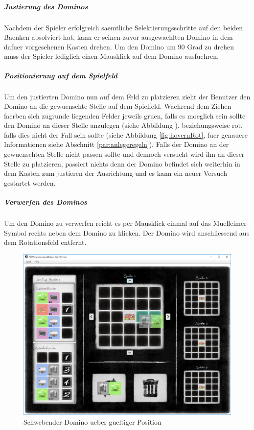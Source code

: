 \subparagraph{Justierung des Dominos}
Nachdem der Spieler erfolgreich saemtliche Selektierungsschritte auf den beiden Baenken absolviert hat, kann er seinen zuvor ausgewaehlten Domino in dem dafuer vorgesehenen Kasten drehen. Um den Domino um 90 Grad zu drehen muss der Spieler lediglich einen Mausklick auf dem Domino ausfuehren. 

\subparagraph{Positionierung auf dem Spielfeld}
Um den justierten Domino nun auf dem Feld zu platzieren zieht der Benutzer den Domino an die gewuenschte Stelle auf dem Spielfeld. Waehrend dem Ziehen faerben sich zugrunde liegenden Felder jeweils gruen, falls es moeglich sein sollte den Domino an dieser Stelle anzulegen (siehe Abbildung \pageref{fig:hovernGruen}), beziehungsweise rot, falls dies nicht der Fall sein sollte (siehe Abbildung \ref{fig:hovernRot}, fuer genauere Informationen siehe Abschnitt \ref{par:anlegeregeln}). Falls der Domino an der gewuenschten Stelle nicht passen sollte und dennoch versucht wird ihn an dieser Stelle zu platzieren, passiert nichts denn der Domino befindet sich weiterhin in dem Kasten zum justieren der Ausrichtung und es kann ein neuer Versuch gestartet werden. 

\subparagraph{Verwerfen des Dominos}
Um den Domino zu verwerfen reicht es per Mausklick einmal auf das Muelleimer-Symbol rechts neben dem Domino zu klicken. Der Domino wird anschliessend aus dem Rotationsfeld entfernt. 

\begin{figure}
	\centering
	\includegraphics{screenshots/screenshot_HovernGruen}
	\caption{Schwebender Domino ueber gueltiger Position}
	\label{fig:hovernGruen}
\end{figure}

